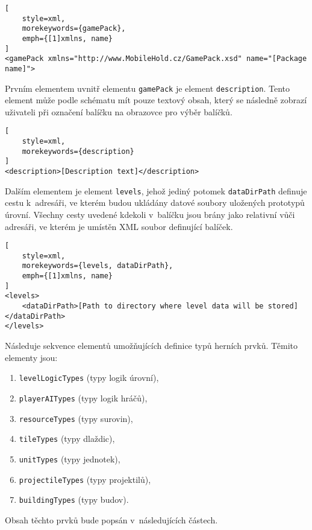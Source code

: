 \begin{lstlisting}[
	style=xml,
	morekeywords={gamePack},
	emph={[1]xmlns, name}
]
<gamePack xmlns="http://www.MobileHold.cz/GamePack.xsd" name="[Package name]">
\end{lstlisting}

Prvním elementem uvnitř elementu \texttt{gamePack} je element \texttt{description}. Tento element může podle schématu mít pouze textový obsah, který se následně zobrazí uživateli při označení balíčku na obrazovce pro výběr balíčků.

\begin{lstlisting}[
	style=xml,
	morekeywords={description}
]
<description>[Description text]</description>
\end{lstlisting}

Dalším elementem je element \texttt{levels}, jehož jediný potomek \texttt{dataDirPath} definuje cestu k~adresáři, ve kterém budou ukládány datové soubory uložených prototypů úrovní. Všechny cesty uvedené kdekoli v~balíčku jsou brány jako relativní vůči adresáři, ve kterém je umístěn XML soubor definující balíček.

\begin{lstlisting}[
	style=xml,
	morekeywords={levels, dataDirPath},
	emph={[1]xmlns, name}
]
<levels>
	<dataDirPath>[Path to directory where level data will be stored]</dataDirPath>
</levels>
\end{lstlisting}

Následuje sekvence elementů umožňujících definice typů herních prvků. Těmito elementy jsou:

\begin{enumerate}
	\item \texttt{levelLogicTypes} (typy logik úrovní),
	\item \texttt{playerAITypes} (typy logik hráčů),
	\item \texttt{resourceTypes} (typy surovin),
	\item \texttt{tileTypes} (typy dlaždic),
	\item \texttt{unitTypes} (typy jednotek),
	\item \texttt{projectileTypes} (typy projektilů),
	\item \texttt{buildingTypes} (typy budov).
\end{enumerate}
Obsah těchto prvků bude popsán v~následujících částech. 

